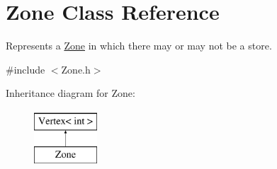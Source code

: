 \hypertarget{classZone}{\section{Zone Class Reference}
\label{classZone}
}


Represents a \hyperlink{classZone}{Zone} in which there may or may not be a store.  




{\ttfamily \#include $<$Zone.\-h$>$}

Inheritance diagram for Zone\-:\begin{figure}[H]
\begin{center}
\leavevmode
\includegraphics[height=2.000000cm]{classZone}
\end{center}
\end{figure}
